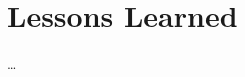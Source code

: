 
\chapter{Lessons Learned} %



\ifpdf
    \graphicspath{{7/figures/PNG/}{7/figures/PDF/}{7/figures/}}
\else
    \graphicspath{{7/figures/EPS/}{7/figures/}}
\fi


% 

\dots



